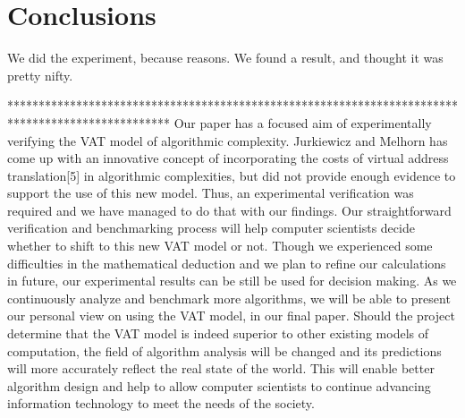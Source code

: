 \section{Conclusions}
We did the experiment, because reasons. We found a result, and thought it
was pretty nifty.

**************************************************************************************************
Our paper has a focused aim of experimentally verifying the VAT model of algorithmic complexity. Jurkiewicz and Melhorn has come up with an innovative concept of incorporating the costs of virtual address translation[5] in algorithmic complexities, but did not provide enough evidence to support the use of this new model. Thus, an experimental verification was required and we have managed to do that with our findings. Our straightforward verification and benchmarking process will help computer scientists decide whether to shift to this new VAT model or not. Though we experienced some difficulties in the mathematical deduction and we plan to refine our calculations in future, our experimental results can be still be used for decision making. As we continuously analyze and benchmark more algorithms, we will be able to present our personal view on using the VAT model, in our final paper. Should the project determine that the VAT model is indeed superior to other existing models of computation, the field of algorithm analysis will be changed and its predictions will more accurately reflect the real state of the world. This will enable better algorithm design and help to allow computer scientists to continue advancing information technology to meet the needs of the society.
